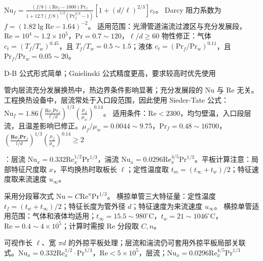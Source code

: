   \\ $\mathrm{Nu}_f=\frac{(f/8)(\mathrm{Re}_f-1000)\mathrm{Pr}_f}{1+12.7(f/8)^{1/2}(\mathrm{Pr}_f^{2/3}-1)}[1+(d/\ell)^{2/3}]c_t$。
Darcy 阻力系数为 $f=(1.82\lg\mathrm{Re}-1.64)^{-2}$。
适用范围：光滑管道湍流过渡区与充分发展段，$\mathrm{Re}=10^4\sim1.2\times10^5$，$\mathrm{Pr}=0.7\sim120$，$\ell/d\ge60$
物性修正：气体 $c_t=(T_f/T_w)^{0.45}$，且 $T_f/T_w=0.5\sim1.5$；液体 $c_t=(\mathrm{Pr}_f/\mathrm{Pr}_w)^{0.11}$，且 $\mathrm{Pr}_f/\mathrm{Pr}_w=0.05\sim20$。

D-B 公式形式简单；Gnielinski 公式精度更高，要求较高时优先使用



管内层流充分发展换热中，热边界条件影响显著；充分发展段的 $\mathrm{Nu}$ 与 $\mathrm{Re}$ 无关。
工程换热设备中，层流常处于入口段范围，因此使用 Sieder-Tate 公式：$\mathrm{Nu}_f=1.86(\frac{\mathrm{Re}_f\mathrm{Pr}_f}{\ell/d})^{1/3}(\frac{\mu_f}{\mu_w})^{0.14}$。
适用条件：$\mathrm{Re}<2300$，均匀壁温，入口段层流，且温差影响已修正。$\mu_f/\mu_w=0.0044\sim9.75$，$\mathrm{Pr}_f=0.48\sim16700$， $\left(\frac{\mathbf{Re}_f\mathbf{Pr}_f}{l/d}\right)^{1/3}\left(\frac{\mu_f}{\mu_w}\right)^{0.14}\geq2$

\divider


：层流 $\mathrm{Nu}_x=0.332\mathrm{Re}_x^{1/2}\mathrm{Pr}^{1/3}$，湍流 $\mathrm{Nu}_x=0.0296\mathrm{Re}_x^{4/5}\mathrm{Pr}^{1/3}$。平板计算注意：局部特征尺度取 $x$，平均换热时取板长 $\ell$；定性温度取 $t_m=(t_\infty+t_w)/2$；特征速度取来流速度 $u_\infty$。

采用分段幂次式 $\mathrm{Nu}=C\mathrm{Re}^n\mathrm{Pr}^{1/3}$。
横掠单管三大特征量：定性温度 $t_f=(t_w+t_\infty)/2$；特征长度为管外径 $d$；特征速度为来流速度 $u_\infty$。
横掠单管适用范围：气体和液体均适用；$t_\infty=15.5\sim980^\circ\mathrm{C}$，$t_w=21\sim1046^\circ\mathrm{C}$，$\mathrm{Re}=0.4\sim4\times10^5$；计算时需按 $\mathrm{Re}$ 分段取 $C,n$。

可视作长 $\ell$、宽 $\pi d$ 的外掠平板处理；层流和湍流仍可套用外掠平板局部关联式。$\mathrm{Nu}_x=0.332\mathrm{Re}_x^{1/2}\cdot \mathrm{Pr}^{1/3}$，$\mathrm{Re}<5\times10^5$，层流；$\mathrm{Nu}_x=0.0296\mathrm{Re}_x^{4/5}\mathrm{Pr}^{1/3}$

